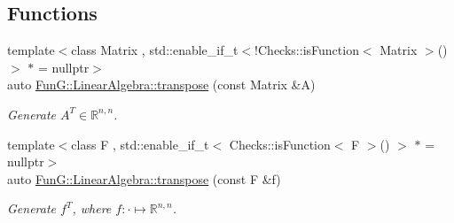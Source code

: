 \subsection*{\-Functions}
\begin{DoxyCompactItemize}
\item 
{\footnotesize template$<$class Matrix , std\-::enable\-\_\-if\-\_\-t$<$!\-Checks\-::is\-Function$<$ Matrix $>$()$>$ $\ast$  = nullptr$>$ }\\auto \hyperlink{group__LinearAlgebraGroup_ga6110875ecb3c2559f8f4b42a3627a65b}{\-Fun\-G\-::\-Linear\-Algebra\-::transpose} (const \-Matrix \&\-A)
\begin{DoxyCompactList}\small\item\em \-Generate $A^T\in\mathbb{R}^{n,n}$. \end{DoxyCompactList}\item 
{\footnotesize template$<$class F , std\-::enable\-\_\-if\-\_\-t$<$ Checks\-::is\-Function$<$ F $>$() $>$ $\ast$  = nullptr$>$ }\\auto \hyperlink{group__LinearAlgebraGroup_ga410ef1b161789c0c9f01ae5f5caf058f}{\-Fun\-G\-::\-Linear\-Algebra\-::transpose} (const \-F \&f)
\begin{DoxyCompactList}\small\item\em \-Generate $f^T$, where $f:\cdot\mapsto\mathbb{R}^{n,n} $. \end{DoxyCompactList}\end{DoxyCompactItemize}

